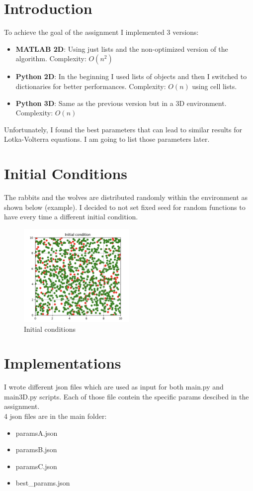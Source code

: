 \documentclass[unicode,11pt,a4paper,oneside,numbers=endperiod,openany]{scrartcl}
\begin{document}
\setassignment

\newline
\section*{Introduction}
To achieve the goal of the assignment I implemented 3 versions:
\begin{itemize}
  \item \textbf{MATLAB 2D}: Using just lists and the non-optimized version of the algorithm. Complexity: $O(n^2)$
  \item \textbf{Python 2D}: In the beginning I used lists of objects and then I switched to dictionaries for better performances. Complexity: $O(n)$ using cell lists. 
  \item \textbf{Python 3D}: Same as the previous version but in a 3D environment. Complexity: $O(n)$
\end{itemize}
Unfortunately, I found the best parameters that can lead to similar  results for Lotka-Volterra equations. I am going to list those parameters later. 
\section*{Initial Conditions}
The rabbits and the wolves are distributed randomly within the environment as shown below (example). I decided to not set fixed seed for random functions
to have every time a different initial condition.
\begin{figure}[H]
  \centering
  \includegraphics[width=0.5\textwidth]{output_main/Initial_condition.png}
  \caption{Initial conditions}
\end{figure}
\section*{Implementations}
I wrote different json files which are used as input for both main.py and main3D.py scripts. Each of those file contein the specific params descibed in the assignment. \\
4 json files are in the main folder:
\begin{itemize}
  \item paramsA.json
  \item paramsB.json
  \item paramsC.json
  \item best\_params.json
  
\end{itemize}
\end{document}
